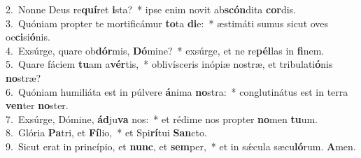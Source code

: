 {2.~}Nonne Deus re\textbf{quí}ret \textbf{i}sta?~* ipse enim novit ab\textbf{scón}dita \textbf{cor}dis.\\
{3.~}Quóniam propter te mortificámur \textbf{to}ta \textbf{di}e:~* æstimáti sumus sicut oves oc\textbf{ci}si\textbf{ó}nis.\\
{4.~}Exsúrge, quare ob\textbf{dór}mis, \textbf{Dó}mine?~* exsúrge, et ne re\textbf{pél}las in \textbf{fi}nem.\\
{5.~}Quare fáciem \textbf{tu}am a\textbf{vér}tis,~* oblivísceris inópiæ nostræ, et tribulati\textbf{ó}nis \textbf{no}stræ?\\
{6.~}Quóniam humiliáta est in púlvere \textbf{á}nima \textbf{no}stra:~* conglutinátus est in terra \textbf{ven}ter \textbf{no}ster.\\
{7.~}Exsúrge, Dómine, \textbf{ád}ju\textbf{va} nos:~* et rédime nos propter \textbf{no}men \textbf{tu}um.\\
{8.~}Glória \textbf{Pa}tri, et \textbf{Fí}lio,~* et Spi\textbf{rí}tui \textbf{San}cto.\\
{9.~}Sicut erat in princípio, et \textbf{nunc}, et \textbf{sem}per,~* et in sǽcula sæcu\textbf{ló}rum. \textbf{A}men.\\
